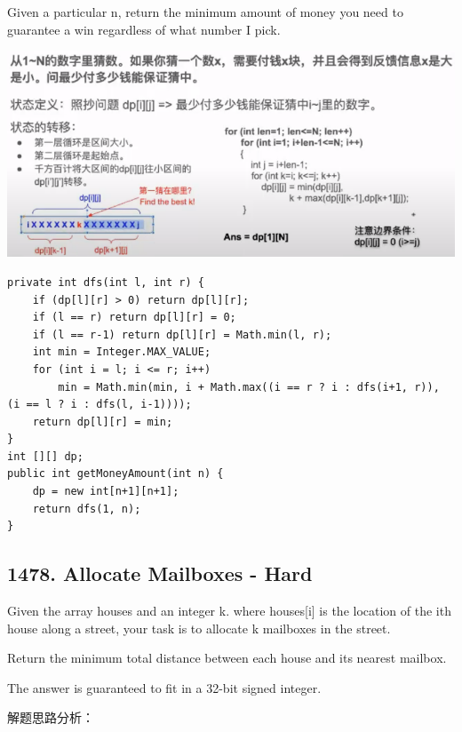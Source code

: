\documentclass[9pt, b5paaper]{book}
\begin{document}
Given a particular n, return the minimum amount of money you need to guarantee a win regardless of what number I pick.

\includegraphics[width=.9\linewidth]{./pic/guessNumber.png}

\begin{verbatim}
private int dfs(int l, int r) {
    if (dp[l][r] > 0) return dp[l][r];
    if (l == r) return dp[l][r] = 0;
    if (l == r-1) return dp[l][r] = Math.min(l, r);
    int min = Integer.MAX_VALUE;
    for (int i = l; i <= r; i++) 
        min = Math.min(min, i + Math.max((i == r ? i : dfs(i+1, r)), (i == l ? i : dfs(l, i-1))));
    return dp[l][r] = min;
}
int [][] dp;
public int getMoneyAmount(int n) {
    dp = new int[n+1][n+1];
    return dfs(1, n);
}
\end{verbatim}
\subsection{1478. Allocate Mailboxes - Hard}
\label{sec-1-4-39}
Given the array houses and an integer k. where houses[i] is the location of the ith house along a street, your task is to allocate k mailboxes in the street.

Return the minimum total distance between each house and its nearest mailbox.

The answer is guaranteed to fit in a 32-bit signed integer.

解题思路分析：
\end{document}
